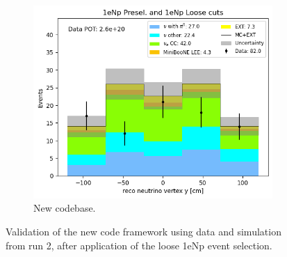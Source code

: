 \begin{figure}[H]
\begin{subfigure}[t]{0.32\linewidth}
        \includegraphics[width=\linewidth]{technote/Appendix_Validation/Figures/1eNp_Loose/Run2_Vertex_Y_Alex.png}
        \caption{New codebase.}
    \end{subfigure}
    \caption{Validation of the new code framework using data and simulation from run 2, after application of the loose 1eNp event selection.}
\end{figure}

